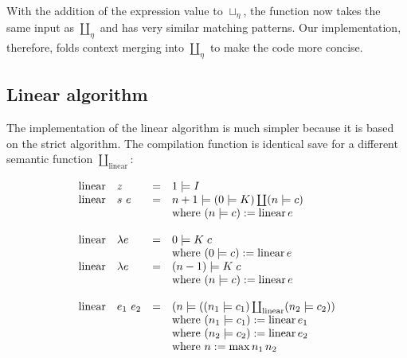 \documentclass[conference]{IEEEtran}
\DeclareMathOperator{\linear}{linear}
\begin{document}
With the addition of the expression value to $\sqcup_\eta$, the function now takes the same input as $\coprod_\eta$ and has very similar matching patterns.
Our implementation, therefore, folds context merging into $\coprod_\eta$ to make the code more concise.

\subsection{Linear algorithm}
The implementation of the linear algorithm is much simpler because it is based on the strict algorithm.
The compilation function is identical save for a different semantic function $\coprod_{\text{linear}}$:

\begin{equation*}
    \begin{array}{l l l l}
        \linear & z         & = & 1 \models I                                                              \\
        \linear & s \ e     & = & n+1 \models (0 \models K) \coprod (n \models c)                          \\
                &           &   & \text{where } (n \models c) := \linear e                                 \\
        \\
        \linear & \lambda e & = & 0 \models K \; c                                                         \\
                &           &   & \text{where } (0 \models c) := \linear e                                 \\
        \linear & \lambda e & = & (n-1) \models K \; c                                                     \\
                &           &   & \text{where } (n \models c) := \linear e                                 \\
        \\
        \linear & e_1 \ e_2 & = & (n \models ((n_1 \models c_1) \coprod_{\text{linear}} (n_2 \models c_2)) \\
                &           &   & \text{where } (n_1 \models c_1) := \linear e_1                           \\
                &           &   & \text{where } (n_2 \models c_2) := \linear e_2                           \\
                &           &   & \text{where } n := \max n_1 \, n_2                                       \\
    \end{array}
\end{equation*}
\end{document}
